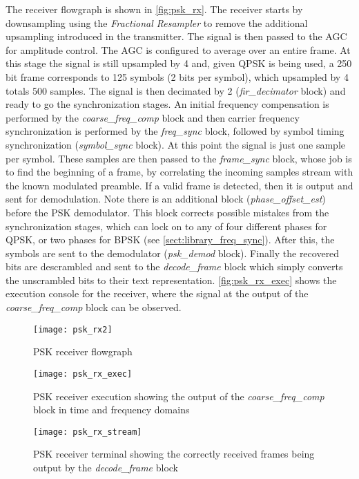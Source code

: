 The receiver flowgraph is shown in \autoref{fig:psk_rx}. The receiver starts by downsampling using the \emph{Fractional Resampler} to remove the additional upsampling introduced in the transmitter. The signal is then passed to the AGC for amplitude control. The AGC is configured to average over an entire frame. At this stage the signal is still upsampled by 4 and, given QPSK is being used, a 250 bit frame corresponds to 125 symbols (2 bits per symbol), which upsampled by 4 totals 500 samples. The signal is then decimated by 2 (\emph{fir\_decimator} block) and ready to go the synchronization stages. An initial frequency compensation is performed by the \emph{coarse\_freq\_comp} block and then carrier frequency synchronization is performed by the \emph{freq\_sync} block, followed by symbol timing synchronization (\emph{symbol\_sync} block). At this point the signal is just one sample per symbol. These samples are then passed to the \emph{frame\_sync} block, whose job is to find the beginning of a frame, by correlating the incoming samples stream with the known modulated preamble. If a valid frame is detected, then it is output and sent for demodulation. Note there is an additional block (\emph{phase\_offset\_est}) before the PSK demodulator. This block corrects possible mistakes from the synchronization stages, which can lock on to any of four different phases for QPSK, or two phases for BPSK (see \autoref{sect:library_freq_sync}). After this, the symbols are sent to the demodulator (\emph{psk\_demod} block). Finally the recovered bits are descrambled and sent to the \emph{decode\_frame} block which simply converts the unscrambled bits to their text representation. \autoref{fig:psk_rx_exec} shows the execution console for the receiver, where the signal at the output of the \emph{coarse\_freq\_comp} block can be observed.

\begin{sidewaysfigure}[ht]
  \centering
  \texttt{[image: psk\_rx2]}
  \caption{PSK receiver flowgraph}
  \label{fig:psk_rx}
\end{sidewaysfigure}
\FloatBarrier
\begin{figure}[H]
  \centering
  \texttt{[image: psk\_rx\_exec]}
  \caption{PSK receiver execution showing the output of the \emph{coarse\_freq\_comp} block in time and frequency domains}
  \label{fig:psk_rx_exec}
\end{figure}

\begin{figure}[H]
  \centering
  \texttt{[image: psk\_rx\_stream]}
  \caption{PSK receiver terminal showing the correctly received frames being output by the \emph{decode\_frame} block}
  \label{fig:psk_rx_stream}
\end{figure}

